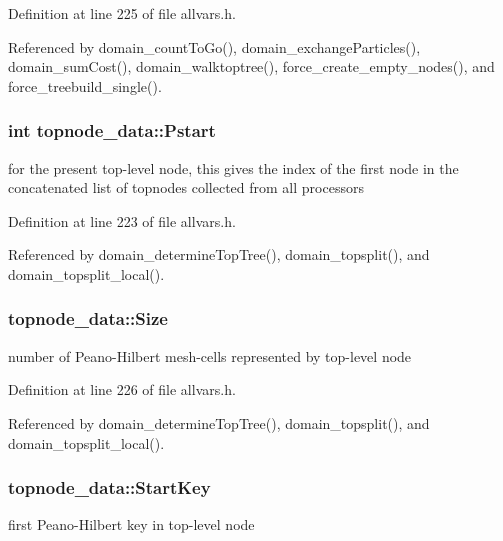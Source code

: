 Definition at line 225 of file allvars.h.



Referenced by domain\_\-countToGo(), domain\_\-exchangeParticles(), domain\_\-sumCost(), domain\_\-walktoptree(), force\_\-create\_\-empty\_\-nodes(), and force\_\-treebuild\_\-single().

\hypertarget{structtopnode__data_abe0b214b3cf372c95a16966304b1592c}{
\subsubsection[{Pstart}]{\setlength{\rightskip}{0pt plus 5cm}int {\bf topnode\_\-data::Pstart}}}
\label{structtopnode__data_abe0b214b3cf372c95a16966304b1592c}
for the present top-\/level node, this gives the index of the first node in the concatenated list of topnodes collected from all processors 

Definition at line 223 of file allvars.h.



Referenced by domain\_\-determineTopTree(), domain\_\-topsplit(), and domain\_\-topsplit\_\-local().

\hypertarget{structtopnode__data_a7a06f0263a5602d4c073100a517892b8}{
\subsubsection[{Size}]{ {\bf topnode\_\-data::Size}}}
\label{structtopnode__data_a7a06f0263a5602d4c073100a517892b8}
number of Peano-\/Hilbert mesh-\/cells represented by top-\/level node 

Definition at line 226 of file allvars.h.



Referenced by domain\_\-determineTopTree(), domain\_\-topsplit(), and domain\_\-topsplit\_\-local().

\hypertarget{structtopnode__data_ab6ae6e924fec05c69ab73ddc2941e855}{
\subsubsection[{StartKey}]{ {\bf topnode\_\-data::StartKey}}}
\label{structtopnode__data_ab6ae6e924fec05c69ab73ddc2941e855}
first Peano-\/Hilbert key in top-\/level node 

